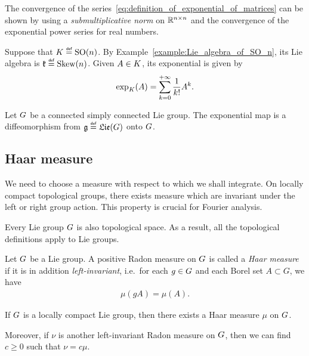 The convergence of the series~\eqref{eq:definition_of_exponential_of_matrices} can be shown
by using a \emph{submultiplicative norm} on ${\mathbb{R}}^{n \times n}$
and the convergence of the exponential power series for real numbers.

\begin{example}
    Suppose that $\CompactGroup \defeq \SpecialOrthogonalGroup n$.
    By Example~\ref{example:Lie_algebra_of_SO_n},
    its Lie algebra is $\LieAlgebraCompactGroup \defeq \SkewSymmetric n$.
    Given $A \in K$,
    its exponential is given by
    \begin{align*}
        \exp_K(A) = \sum_{k = 0}^{+\infty} \frac 1 {k!} A^k.
    \end{align*}
\end{example}

\begin{proposition}
    Let $G$ be a connected simply connected Lie group.
    The exponential map is a diffeomorphism from $\LieAlgebra \defeq \Lie(\Group)$ onto $G$.
\end{proposition}

\subsection{Haar measure}

We need to choose a measure with respect to which we shall integrate.
On locally compact topological groups,
there exists measure which are invariant under the left or right group action.
This property is crucial for Fourier analysis.

\begin{remark}
    Every Lie group $G$ is also topological space.
    As a result, all the topological definitions apply to Lie groups.
\end{remark}

\begin{definition}
    Let $G$ be a Lie group.
    A positive Radon measure on $G$ is called a \emph{Haar measure}
    if it is in addition \emph{left-invariant},
    i.e.\ for each $g \in G$ and each Borel set $A \subset G$, we have
    \begin{align*}
        \mu(g A) = \mu(A).
    \end{align*}
\end{definition}

\begin{proposition}
    If $G$ is a locally compact Lie group,
    then there exists a Haar measure $\mu$ on $G$.

    Moreover, if $\nu$ is another left-invariant Radon measure on $G$,
    then we can find $c \geq 0$ such that $\nu = c \mu$.
\end{proposition}

